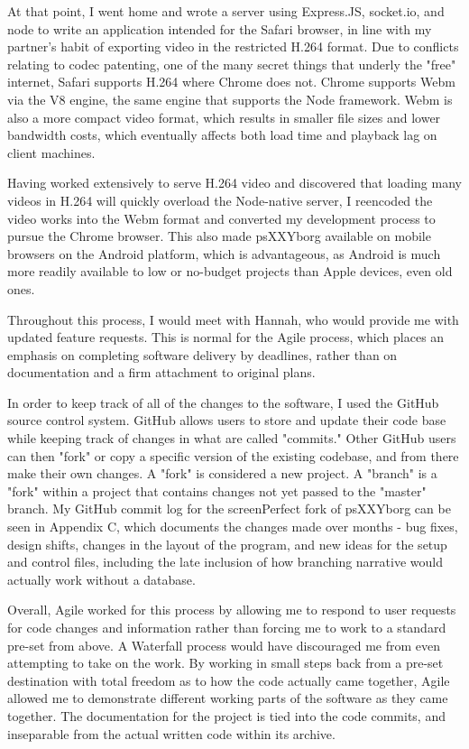 At that point, I went home and wrote a server using Express.JS, socket.io, and node to write an application intended for the Safari browser, in line with my partner's habit of exporting video in the restricted H.264 format. Due to conflicts relating to codec patenting, one of the many secret things that underly the "free" internet, Safari supports H.264 where Chrome does not. Chrome supports Webm via the V8 engine, the same engine that supports the Node framework. Webm is also a more compact video format, which results in smaller file sizes and lower bandwidth costs, which eventually affects both load time and playback lag on client machines. 

Having worked extensively to serve H.264 video and discovered that loading many videos in H.264 will quickly overload the Node-native server, I reencoded the video works into the Webm format and converted my development process to pursue the Chrome browser. This also made psXXYborg available on mobile browsers on the Android platform, which is advantageous, as Android is much more readily available to low or no-budget projects than Apple devices, even old ones.

Throughout this process, I would meet with Hannah, who would provide me with updated feature requests. This is normal for the Agile process, which places an emphasis on completing software delivery by deadlines, rather than on documentation and a firm attachment to original plans. 

In order to keep track of all of the changes to the software, I used the GitHub source control system. GitHub allows users to store and update their code base while keeping track of changes in what are called "commits." Other GitHub users can then "fork" or copy a specific version of the existing codebase, and from there make their own changes. A "fork" is considered a new project. A "branch" is a "fork" within a project that contains changes not yet passed to the "master" branch. My GitHub commit log for the screenPerfect fork of psXXYborg can be seen in Appendix C, which documents the changes made over months - bug fixes, design shifts, changes in the layout of the program, and new ideas for the setup and control files, including the late inclusion of how branching narrative would actually work without a database.

Overall, Agile worked for this process by allowing me to respond to user requests for code changes and information rather than forcing me to work to a standard pre-set from above. A Waterfall process would have discouraged me from even attempting to take on the work. By working in small steps back from a pre-set destination with total freedom as to how the code actually came together, Agile allowed me to demonstrate different working parts of the software as they came together. The documentation for the project is tied into the code commits, and inseparable from the actual written code within its archive.


